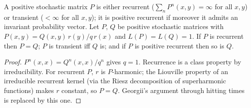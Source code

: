 \begin{proposition}[Georgii (11.7)]
    \label{prop:bl-11-7}
    \leanok

    A positive stochastic matrix $P$ is either recurrent ($\sum_n P^n(x,y) = \infty$ for all
    $x, y$) or transient ($< \infty$ for all $x, y$); it is positive recurrent if moreover it
    admits an invariant probability vector. Let $P$, $Q$ be positive stochastic matrices with
    $P(x,y) = Q(x,y)\, r(y) / q\, r(x)$ and $L(P) = L(Q) = 1$. If $P$ is recurrent then $P = Q$;
    $P$ is transient iff $Q$ is; and if $P$ is positive recurrent then so is $Q$.
\end{proposition}
\begin{proof}
    \leanok
    $P^n(x,x) = Q^n(x,x)/q^n$ gives $q = 1$. Recurrence is a class property by irreducibility.
    For recurrent $P$, $r$ is $P$-harmonic; the Liouville property of an irreducible recurrent
    kernel (via the Riesz decomposition of superharmonic functions) makes $r$ constant, so
    $P = Q$. Georgii's argument through hitting times is replaced by this one.
\end{proof}

